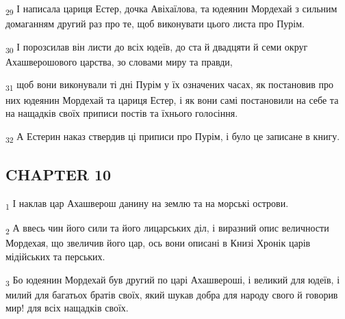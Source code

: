 \begin{tcolorbox}
\textsubscript{29} І написала цариця Естер, дочка Авіхаїлова, та юдеянин Мордехай з сильним домаганням другий раз про те, щоб виконувати цього листа про Пурім.
\end{tcolorbox}
\begin{tcolorbox}
\textsubscript{30} І порозсилав він листи до всіх юдеїв, до ста й двадцяти й семи округ Ахашверошового царства, зо словами миру та правди,
\end{tcolorbox}
\begin{tcolorbox}
\textsubscript{31} щоб вони виконували ті дні Пурім у їх означених часах, як постановив про них юдеянин Мордехай та цариця Естер, і як вони самі постановили на себе та на нащадків своїх приписи постів та їхнього голосіння.
\end{tcolorbox}
\begin{tcolorbox}
\textsubscript{32} А Естерин наказ ствердив ці приписи про Пурім, і було це записане в книгу.
\end{tcolorbox}
\subsection{CHAPTER 10}
\begin{tcolorbox}
\textsubscript{1} І наклав цар Ахашверош данину на землю та на морські острови.
\end{tcolorbox}
\begin{tcolorbox}
\textsubscript{2} А ввесь чин його сили та його лицарських діл, і виразний опис величности Мордехая, що звеличив його цар, ось вони описані в Книзі Хронік царів мідійських та перських.
\end{tcolorbox}
\begin{tcolorbox}
\textsubscript{3} Бо юдеянин Мордехай був другий по царі Ахашвероші, і великий для юдеїв, і милий для багатьох братів своїх, який шукав добра для народу свого й говорив мир! для всіх нащадків своїх.
\end{tcolorbox}
